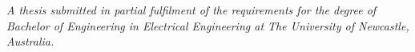 \begin{titlepage}
    \vfill
    
    \emph{A thesis submitted in partial fulfilment of the requirements for the degree of Bachelor of Engineering in Electrical Engineering at The University of Newcastle, Australia.}
    
    \vfill
\end{titlepage}

